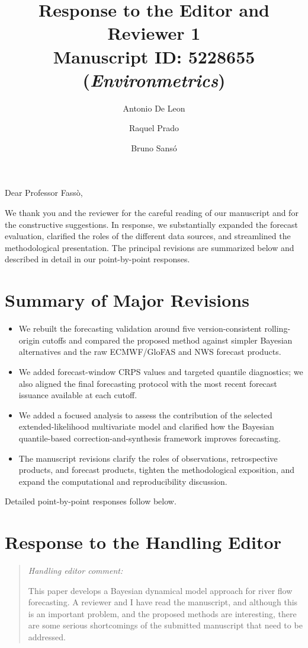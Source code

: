 \documentclass[11pt,letterpaper]{article}
\title{\textbf{Response to the Editor and Reviewer 1}\\
Manuscript ID: 5228655 (\emph{Environmetrics})}
\author{Antonio De Leon \and Raquel Prado \and Bruno Sans\'o}
\newenvironment{commentblock}{\begin{quote}\small\itshape}{\end{quote}}
\begin{document}
\maketitle
\begin{flushleft}
Dear Professor Fass\`o,
\end{flushleft}

We thank you and the reviewer for the careful reading of our manuscript and for the constructive suggestions.
In response, we substantially expanded the forecast evaluation, clarified the roles of the different data sources, and streamlined the methodological presentation. The principal revisions are summarized below and described in detail in our point-by-point responses.

\section*{Summary of Major Revisions}
\begin{itemize}
\item We rebuilt the forecasting validation around five version-consistent rolling-origin cutoffs and compared the proposed method against simpler Bayesian alternatives and the raw ECMWF/GloFAS and NWS forecast products.
\item We added forecast-window CRPS values and targeted quantile diagnostics; we also aligned the final forecasting protocol with the most recent forecast issuance available at each cutoff.
\item We added a focused analysis to assess the contribution of the selected extended-likelihood multivariate model and clarified how the Bayesian quantile-based correction-and-synthesis framework improves forecasting.
\item The manuscript revisions clarify the roles of observations, retrospective products, and forecast products, tighten the methodological exposition, and expand the computational and reproducibility discussion.
\end{itemize}

Detailed point-by-point responses follow below.

\newpage

\section{Response to the Handling Editor}

\begin{commentblock}
Handling editor comment:

This paper develops a Bayesian dynamical model approach for river flow forecasting. A reviewer and I have read the manuscript, and although this is an important problem, and the proposed methods are interesting, there are some serious shortcomings of the submitted manuscript that need to be addressed.
\end{commentblock}
\end{document}

